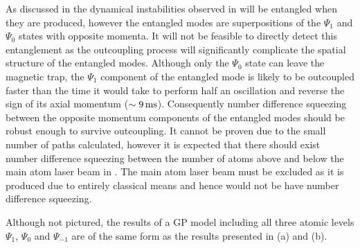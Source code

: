 As discussed in  the dynamical instabilities observed in  will be entangled when they are produced, however the entangled modes are superpositions of the $\Psi_1$ and $\Psi_0$ states with opposite momenta. It will not be feasible to directly detect this entanglement as the outcoupling process will significantly complicate the spatial structure of the entangled modes. Although only the $\Psi_0$ state can leave the magnetic trap, the $\Psi_1$ component of the entangled mode is likely to be outcoupled faster than the time it would take to perform half an oscillation and reverse the sign of its axial momentum ($\sim \unit[9]{ms}$). Consequently number difference squeezing between the opposite momentum components of the entangled modes should be robust enough to survive outcoupling. It cannot be proven due to the small number of paths calculated, however it is expected that there should exist number difference squeezing between the number of atoms above and below the main atom laser beam in . The main atom laser beam must be excluded as it is produced due to entirely classical means and hence would not be have number difference squeezing.

Although not pictured, the results of a GP model including all three atomic levels $\Psi_1$, $\Psi_0$ and $\Psi_{-1}$ are of the same form as the results presented in (a) and (b).




% 



